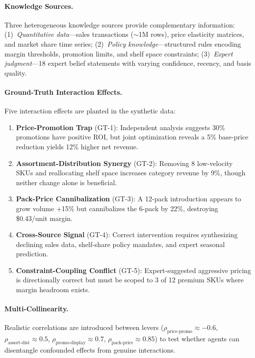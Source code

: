 \documentclass[11pt,a4paper]{article}
\begin{document}
\paragraph{Knowledge Sources.}
Three heterogeneous knowledge sources provide complementary information:
(1)~\textit{Quantitative data}---sales transactions (${\sim}$1M rows), price elasticity matrices, and market share time series;
(2)~\textit{Policy knowledge}---structured rules encoding margin thresholds, promotion limits, and shelf space constraints;
(3)~\textit{Expert judgment}---18 expert belief statements with varying confidence, recency, and basis quality.

\paragraph{Ground-Truth Interaction Effects.}
Five interaction effects are planted in the synthetic data:
\begin{enumerate}
    \item \textbf{Price-Promotion Trap} (GT-1): Independent analysis suggests 30\% promotions have positive ROI, but joint optimization reveals a 5\% base-price reduction yields 12\% higher net revenue.
    \item \textbf{Assortment-Distribution Synergy} (GT-2): Removing 8 low-velocity SKUs and reallocating shelf space increases category revenue by 9\%, though neither change alone is beneficial.
    \item \textbf{Pack-Price Cannibalization} (GT-3): A 12-pack introduction appears to grow volume +15\% but cannibalizes the 6-pack by 22\%, destroying \$0.43/unit margin.
    \item \textbf{Cross-Source Signal} (GT-4): Correct intervention requires synthesizing declining sales data, shelf-share policy mandates, and expert seasonal prediction.
    \item \textbf{Constraint-Coupling Conflict} (GT-5): Expert-suggested aggressive pricing is directionally correct but must be scoped to 3 of 12 premium SKUs where margin headroom exists.
\end{enumerate}

\paragraph{Multi-Collinearity.}
Realistic correlations are introduced between levers ($\rho_{\text{price-promo}} \approx -0.6$, $\rho_{\text{assort-dist}} \approx 0.5$, $\rho_{\text{promo-display}} \approx 0.7$, $\rho_{\text{pack-price}} \approx 0.85$) to test whether agents can disentangle confounded effects from genuine interactions.
\end{document}
